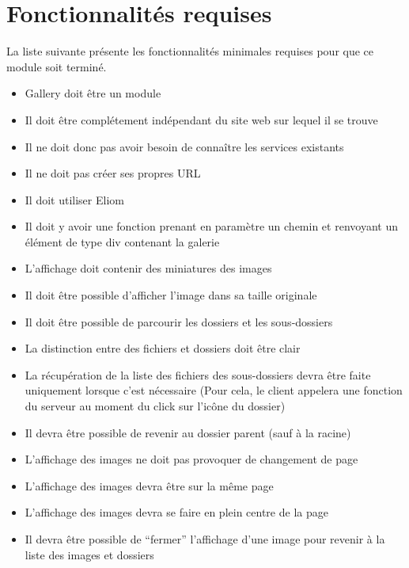 \documentclass{life-fr}
\begin{document}
\section{Fonctionnalités requises}

La liste suivante présente les fonctionnalités minimales requises pour
que ce module soit terminé.

\begin{itemize}
  \item Gallery doit être un module 
  \item Il doit être complétement indépendant du site web sur lequel
    il se trouve
  \item Il ne doit donc pas avoir besoin de connaître les services
    existants
  \item Il ne doit pas créer ses propres URL
  \item Il doit utiliser Eliom
\end{itemize}
\begin{itemize}
  \item Il doit y avoir une fonction prenant en paramètre un chemin et
    renvoyant un élément de type div contenant la galerie
  \item L'affichage doit contenir des miniatures des images
  \item Il doit être possible d'afficher l'image dans sa taille originale
\end{itemize}
\begin{itemize}
  \item Il doit être possible de parcourir les dossiers et les
    sous-dossiers
  \item La distinction entre des fichiers et dossiers doit être clair
  \item La récupération de la liste des fichiers des sous-dossiers
    devra être faite uniquement lorsque c'est nécessaire (Pour cela,
    le client appelera une fonction du serveur au moment du click sur
    l'icône du dossier)
  \item Il devra être possible de revenir au dossier parent (sauf à la racine)
\end{itemize}
\begin{itemize}
  \item L'affichage des images ne doit pas provoquer de changement de page
  \item L'affichage des images devra être sur la même page
  \item L'affichage des images devra se faire en plein centre de la page
  \item Il devra être possible de ``fermer'' l'affichage d'une image
    pour revenir à la liste des images et dossiers
\end{itemize}
\end{document}
